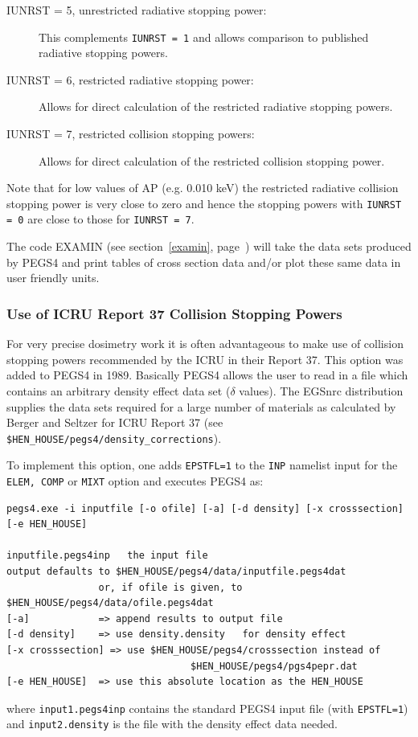 \begin{description}
\item[IUNRST = 5, unrestricted radiative stopping power:] This complements
{\tt IUNRST = 1} and allows comparison to published radiative stopping powers.

\item[IUNRST = 6, restricted radiative stopping power:] Allows for direct
calculation of the restricted radiative stopping powers.

\item[IUNRST = 7, restricted collision stopping powers:] Allows for direct
calculation of the restricted collision stopping power.
\end{description}
Note that for low values of AP (e.g. 0.010 keV) the restricted radiative
collision stopping power is very close to zero and hence the stopping
powers with {\tt IUNRST = 0} are close to those for {\tt IUNRST = 7}.

The code EXAMIN (see section~\ref{examin}, page~\pageref{examin}) will take
the data sets produced by PEGS4 and print tables of cross section data
and/or plot these same data in user friendly units.

\subsubsection{Use of ICRU Report 37 Collision Stopping Powers}
\label{icru37_csp}
For very precise dosimetry work it is often advantageous to make use of
collision stopping powers recommended by the ICRU in their Report
37\cite{ICRU37}.  This option was added to PEGS4 in 1989\cite{Du89}.
Basically PEGS4 allows the user to read in a file which contains an arbitrary
density effect data set ($\delta$ values). The EGSnrc distribution
supplies the data sets
required for a large number of materials as calculated by Berger and
Seltzer\cite{BS83} for ICRU Report 37 (see
\verb+$HEN_HOUSE/pegs4/density_corrections+).
 

To implement this option, one adds {\tt EPSTFL=1} to the {\tt INP} 
namelist input for the {\tt ELEM, COMP} or {\tt MIXT} option
and executes PEGS4 as:
\begin{verbatim}
pegs4.exe -i inputfile [-o ofile] [-a] [-d density] [-x crosssection] [-e HEN_HOUSE]

inputfile.pegs4inp   the input file
output defaults to $HEN_HOUSE/pegs4/data/inputfile.pegs4dat
                or, if ofile is given, to $HEN_HOUSE/pegs4/data/ofile.pegs4dat
[-a]            => append results to output file
[-d density]    => use density.density   for density effect
[-x crosssection] => use $HEN_HOUSE/pegs4/crosssection instead of
                                $HEN_HOUSE/pegs4/pgs4pepr.dat
[-e HEN_HOUSE]  => use this absolute location as the HEN_HOUSE
\end{verbatim}
where {\tt input1.pegs4inp} contains the standard PEGS4 input file (with
{\tt EPSTFL=1}) and {\tt  input2.density} is the file with the density effect
data needed.

